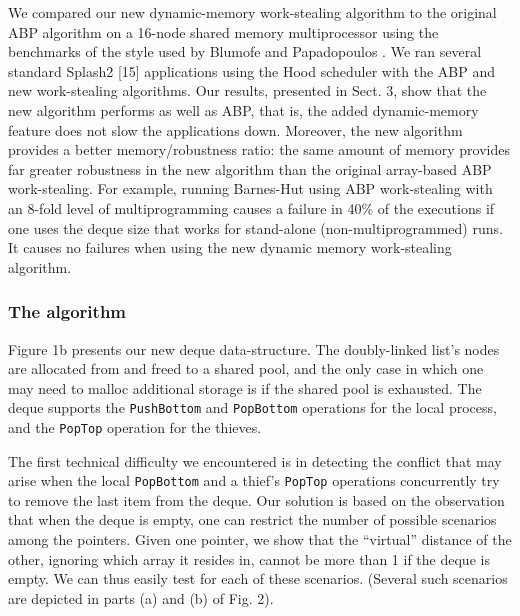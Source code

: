 
We compared our new dynamic-memory work-stealing algorithm to the
original ABP algorithm on a 16-node shared memory multiprocessor using
the benchmarks of the style used by Blumofe and Papadopoulos
\cite{Blumofe1998a}. We ran several standard Splash2 [15] applications
using the Hood scheduler \cite{Papadopoulos1998} with the ABP and new
work-stealing algorithms. Our results, presented in Sect. 3, show that
the new algorithm performs as well as ABP, that is, the added
dynamic-memory feature does not slow the applications down. Moreover,
the new algorithm provides a better memory/robustness ratio: the same
amount of memory provides far greater robustness in the new algorithm
than the original array-based ABP work-stealing. For example, running
Barnes-Hut using ABP work-stealing with an 8-fold level of
multiprogramming causes a failure in 40\% of the executions if one
uses the deque size that works for stand-alone (non-multiprogrammed)
runs. It causes no failures when using the new dynamic memory
work-stealing algorithm.

\subsubsection{The algorithm}


Figure 1b presents our new deque data-structure. The doubly-linked
list's nodes are allocated from and freed to a shared pool, and the
only case in which one may need to malloc additional storage is if the
shared pool is exhausted. The deque supports the
\lstinline!PushBottom! and \lstinline!PopBottom! operations for the
local process, and the \lstinline!PopTop! operation for the thieves.

The first technical difficulty we encountered is in detecting the
conflict that may arise when the local \lstinline!PopBottom! and a
thief's \lstinline!PopTop! operations concurrently try to remove the
last item from the deque. Our solution is based on the observation
that when the deque is empty, one can restrict the number of possible
scenarios among the pointers. Given one pointer, we show that the
``virtual'' distance of the other, ignoring which array it resides in,
cannot be more than 1 if the deque is empty. We can thus easily test
for each of these scenarios. (Several such scenarios are depicted in
parts (a) and (b) of Fig. 2).

